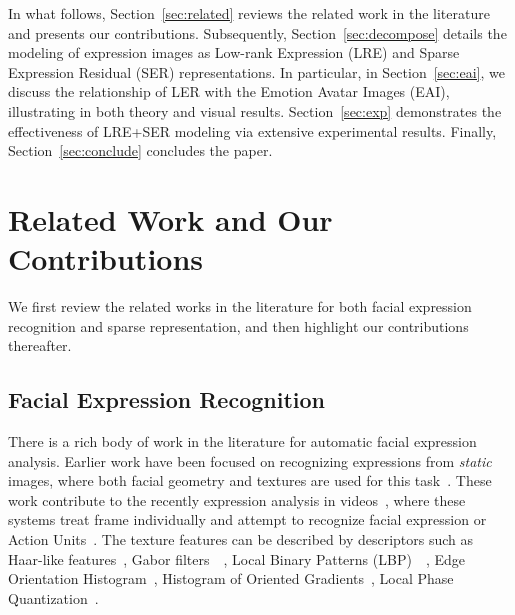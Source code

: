 \documentclass[journal]{IEEEtran}
\begin{document}
In what follows, Section~\ref{sec:related} reviews the related work in the literature and presents our contributions. Subsequently, Section~\ref{sec:decompose} details the modeling of expression images as Low-rank Expression (LRE) and Sparse Expression Residual (SER) representations. In particular, in Section~\ref{sec:eai}, we discuss the relationship of LER with the Emotion Avatar Images (EAI), illustrating in both theory and visual results. Section~\ref{sec:exp} demonstrates the effectiveness of LRE+SER modeling via extensive experimental results. Finally, Section~\ref{sec:conclude} concludes the paper.


\section{Related Work and Our Contributions\label{sec:related}}

We first review the related works in the literature for both facial expression recognition and sparse representation, and then highlight our contributions thereafter. 

\subsection{Facial Expression Recognition}

There is a rich body of work in the literature for automatic facial expression analysis. Earlier work have been focused on recognizing expressions from \textit{static} images, where both facial geometry and textures are used for this task~\cite{Pantic_PAMI00}\cite{Essa_PAMI97}\cite{Donato_PAMI99}. These work contribute to the recently expression analysis in videos~\cite{Bartlett_FG11}\cite{Kaliouby_SMC04}\cite{Valstar_FERA11}, where these systems treat frame individually and attempt to recognize facial expression or Action Units~\cite{Ekman78}. The texture features can be described by descriptors such as Haar-like features~\cite{Whitehill_FG06}, Gabor filters~\cite{Lyons_PAMI99}~\cite{Bartlett_FG11}, Local Binary Patterns (LBP)~\cite{Shan_IVC09}~\cite{Jiang_FG11}, Edge Orientation Histogram~\cite{Levi_CVPR04}, Histogram of Oriented Gradients~\cite{Dalal_CVPR05}\cite{Dhall_FERA11}\cite{Dahmane_FERA11}, Local Phase Quantization~\cite{LPQ}.
\end{document}
